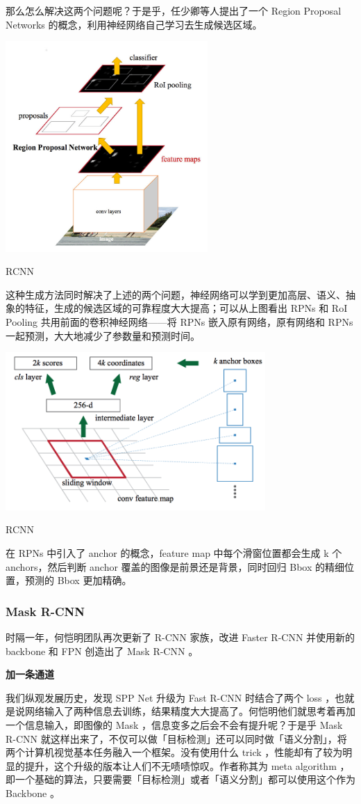 那么怎么解决这两个问题呢？于是乎，任少卿等人提出了一个 Region Proposal Networks 的概念，利用神经网络自己学习去生成候选区域。
\begin{uscfigure}
	\includegraphics[width=\textwidth,height=8cm]{./Pictures/faster_rcnn.jpg}	
	\caption{RCNN}	
\end{uscfigure}
这种生成方法同时解决了上述的两个问题，神经网络可以学到更加高层、语义、抽象的特征，生成的候选区域的可靠程度大大提高；可以从上图看出 RPNs 和 RoI Pooling 共用前面的卷积神经网络——将 RPNs 嵌入原有网络，原有网络和 RPNs 一起预测，大大地减少了参数量和预测时间。
\begin{uscfigure}
	\includegraphics[width=\textwidth,height=6cm]{./Pictures/faster_rcnn_anchor.png}	
	\caption{RCNN}	
\end{uscfigure}
在 RPNs 中引入了 anchor 的概念，feature map 中每个滑窗位置都会生成 k 个 anchors，然后判断 anchor 覆盖的图像是前景还是背景，同时回归 Bbox 的精细位置，预测的 Bbox 更加精确。
\subsubsection{Mask R-CNN}
时隔一年，何恺明团队再次更新了 R-CNN 家族，改进 Faster R-CNN 并使用新的 backbone 和 FPN 创造出了 Mask R-CNN 。

\textbf{加一条通道}

我们纵观发展历史，发现 SPP Net 升级为 Fast R-CNN 时结合了两个 loss ，也就是说网络输入了两种信息去训练，结果精度大大提高了。何恺明他们就思考着再加一个信息输入，即图像的 Mask ，信息变多之后会不会有提升呢？于是乎 Mask R-CNN 就这样出来了，不仅可以做「目标检测」还可以同时做「语义分割」，将两个计算机视觉基本任务融入一个框架。没有使用什么 trick ，性能却有了较为明显的提升，这个升级的版本让人们不无啧啧惊叹。作者称其为 meta algorithm ，即一个基础的算法，只要需要「目标检测」或者「语义分割」都可以使用这个作为 Backbone 。


